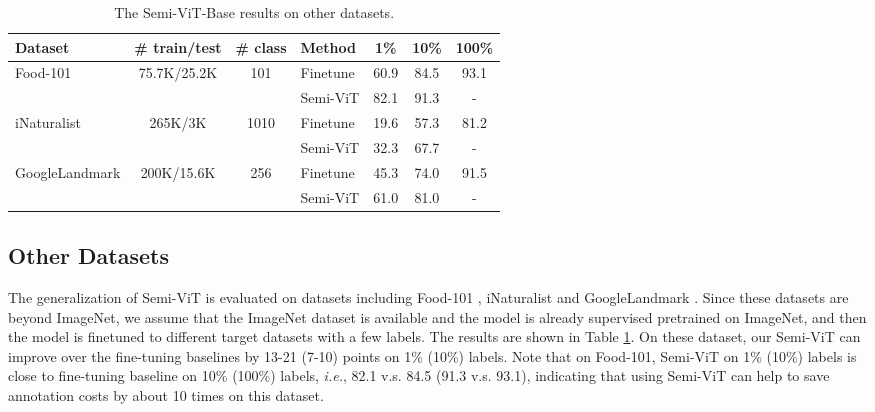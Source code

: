 \documentclass{article}
\newcommand\ie{\emph{i.e.}}
\begin{document}
\setlength{\tabcolsep}{8pt}
\begin{table}[t]
\begin{center}
\small
\begin{tabular}{lcclccc}
\toprule
Dataset &\# train/test &\# class &Method & 1\% & 10\% & 100\% \\\hline
\multirow{2}{*}{Food-101 \cite{DBLP:conf/eccv/BossardGG14}} &\multirow{2}{*}{75.7K/25.2K} &\multirow{2}{*}{101} &Finetune &60.9 &84.5 &93.1 \\
& & &Semi-ViT &82.1 &91.3 &- \\\hline
\multirow{2}{*}{iNaturalist \cite{DBLP:journals/corr/HornASSAPB17}} &\multirow{2}{*}{265K/3K} &\multirow{2}{*}{1010} & Finetune &19.6 &57.3 &81.2 \\
& & &Semi-ViT &32.3 &67.7 &- \\\hline
\multirow{2}{*}{GoogleLandmark \cite{DBLP:conf/iccv/NohASWH17}} &\multirow{2}{*}{200K/15.6K} &\multirow{2}{*}{256} & Finetune &45.3 &74.0 &91.5 \\
& & &Semi-ViT &61.0 &81.0 &- \\
\bottomrule
\end{tabular}
\caption{The Semi-ViT-Base results on other datasets.}
\label{tab:other datasets}
\end{center}\vspace{-3mm}
\end{table}


\subsection{Other Datasets}

The generalization of Semi-ViT is evaluated on datasets including Food-101 \cite{DBLP:conf/eccv/BossardGG14}, iNaturalist \cite{DBLP:journals/corr/HornASSAPB17} and GoogleLandmark \cite{DBLP:conf/iccv/NohASWH17}. Since these datasets are beyond ImageNet, we assume that the ImageNet dataset is available and the model is already supervised pretrained on ImageNet, and then the model is finetuned to different target datasets with a few labels. The results are shown in Table \ref{tab:other datasets}. On these dataset, our Semi-ViT can improve over the fine-tuning baselines by 13-21 (7-10) points on 1\% (10\%) labels. Note that on Food-101, Semi-ViT on 1\% (10\%) labels is close to fine-tuning baseline on 10\% (100\%) labels, \ie, 82.1 v.s. 84.5 (91.3 v.s. 93.1), indicating that using Semi-ViT can help to save annotation costs by about 10 times on this dataset.
\end{document}
